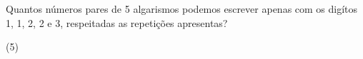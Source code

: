 \documentclass[10pt,a4paper]{article}
\begin{document}
\begin{multicols}{2}
    \begin{question}[type=exam]
        Quantos números pares de 5 algarismos podemos escrever apenas com os
        digítos 1, 1, 2, 2 e 3, respeitadas as repetições apresentas?

        \begin{tasks}(5)
        \end{tasks}
    \end{question}


		\clearpage
	\end{multicols}

\end{document}
